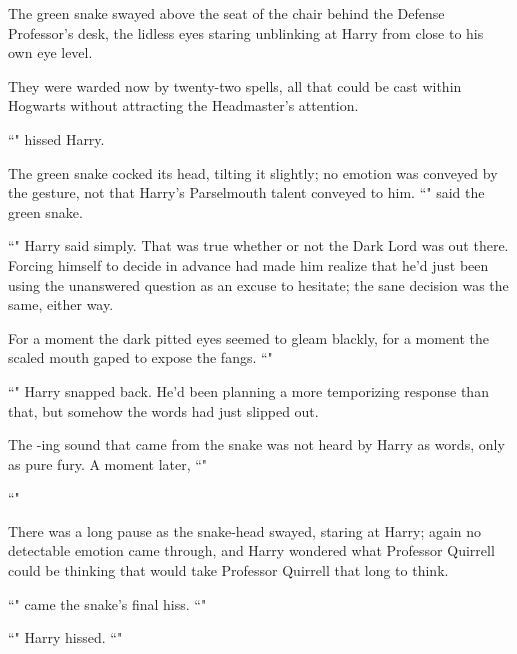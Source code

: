 The green snake swayed above the seat of the chair behind the Defense Professor's desk, the lidless eyes staring unblinking at Harry from close to his own eye level.

They were warded now by twenty-two spells, all that could be cast within Hogwarts without attracting the Headmaster's attention.

``" hissed Harry.

The green snake cocked its head, tilting it slightly; no emotion was conveyed by the gesture, not that Harry's Parselmouth talent conveyed to him. ``" said the green snake.

``" Harry said simply. That was true whether or not the Dark Lord was out there. Forcing himself to decide in advance had made him realize that he'd just been using the unanswered question as an excuse to hesitate; the sane decision was the same, either way.

For a moment the dark pitted eyes seemed to gleam blackly, for a moment the scaled mouth gaped to expose the fangs. ``"

``" Harry snapped back. He'd been planning a more temporizing response than that, but somehow the words had just slipped out.

The -ing sound that came from the snake was not heard by Harry as words, only as pure fury. A moment later, ``"

``"

There was a long pause as the snake-head swayed, staring at Harry; again no detectable emotion came through, and Harry wondered what Professor Quirrell could be thinking that would take Professor Quirrell that long to think.

``" came the snake's final hiss. ``"

``" Harry hissed. ``"

